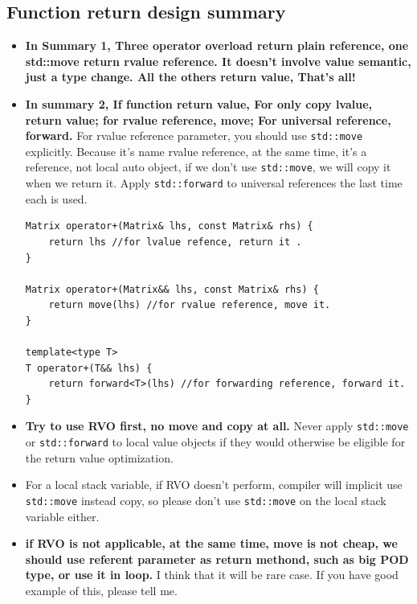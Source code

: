 \documentclass[a4paper,11pt,twoside]{book}
\begin{document}
\subsection{Function return design summary}

\begin{itemize}
		\item \textbf{In Summary 1, Three operator overload return plain reference, one std::move return rvalue reference. It doesn't involve value semantic, just a type change. All the others return value, That's all!}
	
		\item \textbf{In summary 2, If function return value, For only copy lvalue, return value; for rvalue reference, move;  For universal reference, forward. } For rvalue reference parameter, you should use \texttt{std::move} explicitly. Because it's name rvalue reference, at the same time, it's a reference, not local auto object, if we don't use \texttt{std::move}, we will copy it when we return it.  Apply \texttt{std::forward} to universal references the last time each is used.
	
\begin{lstlisting}[numbers=none]
Matrix operator+(Matrix& lhs, const Matrix& rhs) {
	return lhs //for lvalue refence, return it .
}
	
Matrix operator+(Matrix&& lhs, const Matrix& rhs) {
	return move(lhs) //for rvalue reference, move it.
}
	
template<type T>
T operator+(T&& lhs) {
	return forward<T>(lhs) //for forwarding reference, forward it.
}
\end{lstlisting}

		\item \textbf{Try to use RVO first, no move and copy at all.} Never apply \texttt{std::move} or \texttt{std::forward} to local value objects if they would otherwise be eligible for the return value optimization.

		\item For a local stack variable, if RVO doesn't perform, compiler will implicit use \texttt{std::move} instead copy, so please don't use \texttt{std::move} on the local stack variable either.

		\item \textbf{if RVO is not applicable, at the same time, move is not cheap, we should use referent parameter as return methond, such as big POD type, or use it in loop.} I think that it will be rare case. If you have good example of this, please tell me. 

\end{itemize}
\end{document}
